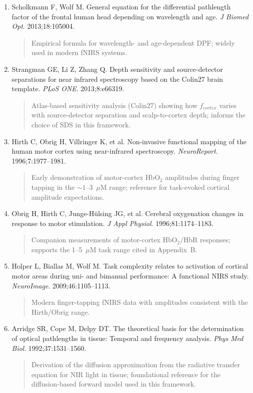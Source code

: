 \documentclass[12pt]{article}
\def\mathrm#1{#1}%
\begin{document}
\begin{enumerate}
\item Scholkmann F, Wolf M. General equation for the differential pathlength factor of the frontal human head depending on wavelength and age. \textit{J Biomed Opt}. 2013;18:105004.
\begin{quote}
Empirical formula for wavelength- and age-dependent DPF; widely used in modern fNIRS systems.
\end{quote}

\item Strangman GE, Li Z, Zhang Q. Depth sensitivity and source-detector separations for near infrared spectroscopy based on the Colin27 brain template. \textit{PLoS ONE}. 2013;8:e66319.
\begin{quote}
Atlas-based sensitivity analysis (Colin27) showing how $f_{\mathrm{cortex}}$ varies with source-detector separation and scalp-to-cortex depth; informs the choice of SDS in this framework.
\end{quote}

\item Hirth C, Obrig H, Villringer K, et al. Non-invasive functional mapping of the human motor cortex using near-infrared spectroscopy. \textit{NeuroReport}. 1996;7:1977--1981.
\begin{quote}
Early demonstration of motor-cortex HbO$_2$ amplitudes during finger tapping in the ${\sim}1$--3~$\mu$M range; reference for task-evoked cortical amplitude expectations.
\end{quote}

\item Obrig H, Hirth C, Junge-H\"ulsing JG, et al. Cerebral oxygenation changes in response to motor stimulation. \textit{J Appl Physiol}. 1996;81:1174--1183.
\begin{quote}
Companion measurements of motor-cortex HbO$_2$/HbR responses; supports the 1--5~$\mu$M task range cited in Appendix~B.
\end{quote}

\item Holper L, Biallas M, Wolf M. Task complexity relates to activation of cortical motor areas during uni- and bimanual performance: A functional NIRS study. \textit{NeuroImage}. 2009;46:1105--1113.
\begin{quote}
Modern finger-tapping fNIRS data with amplitudes consistent with the Hirth/Obrig range.
\end{quote}

\item Arridge SR, Cope M, Delpy DT. The theoretical basis for the determination of optical pathlengths in tissue: Temporal and frequency analysis. \textit{Phys Med Biol}. 1992;37:1531--1560.
\begin{quote}
Derivation of the diffusion approximation from the radiative transfer equation for NIR light in tissue; foundational reference for the diffusion-based forward model used in this framework.
\end{quote}


\end{enumerate}
\end{document}
